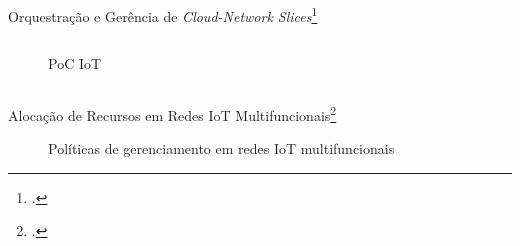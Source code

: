 \begin{frame}{Orquestração e Gerência de \textit{Cloud-Network Slices}\footcite{Rocha2022}}
\begin{columns}
\begin{column}{0.5\linewidth}
\begin{figure}
                \caption{PoC IoT}
            \end{figure}            
        \end{column}
    \end{columns}
\end{frame}

\begin{frame}{Alocação de Recursos em Redes IoT Multifuncionais\footcite{Silva2024}}
    \begin{figure}
        \centering
        \hspace{0.5cm}
        \caption{Políticas de gerenciamento em redes IoT multifuncionais}
        \label{fig:enter-label}
    \end{figure}
\end{frame}

